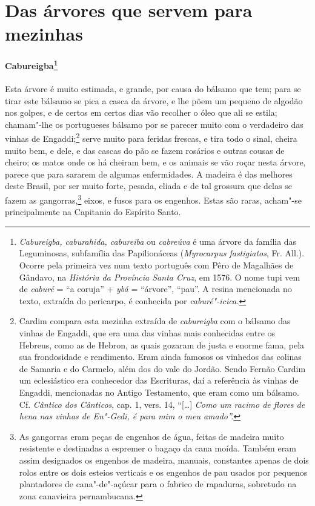 \section{Das árvores que servem para mezinhas}
\paragraph{Cabureigba\footnote{ \textit{Cabureigba, caburahida,
cabureiba} ou \textit{cabreúva} é uma árvore da família das
Leguminosas, subfamília das Papilionáceas (\textit{Myrocarpus
fastigiatos}, Fr. All.). Ocorre pela primeira vez num texto português
com Pêro de Magalhães de Gândavo, na \textit{História da Província Santa
Cruz}, em 1576. O nome tupi vem de \textit{caburé} = ``a
coruja'' + \textit{ybá} = ``árvore'', ``pau''. A resina mencionada no texto,
extraída do pericarpo, é conhecida por
\textit{caburé"-icica.}}} Esta árvore é muito estimada, e
grande, por causa do bálsamo que tem; para se tirar este bálsamo se
pica a casca da árvore, e lhe põem um pequeno de algodão nos golpes, e
de certos em certos dias vão recolher o óleo que ali se estila;
chamam"-lhe os portugueses bálsamo por se parecer muito com o verdadeiro
das vinhas de Engaddi;\footnote{ Cardim compara esta mezinha extraída
de \textit{cabureigba} com o bálsamo das vinhas de Engaddi, que era uma
das vinhas mais conhecidas entre os Hebreus, como as de Hebron, as
quais gozaram de justa e enorme fama, pela sua frondosidade e
rendimento. Eram ainda famosos os vinhedos das colinas de Samaria e do
Carmelo, além dos do vale do Jordão. Sendo Fernão Cardim um
eclesiástico era conhecedor das Escrituras, daí a referência às vinhas
de Engaddi, mencionadas no Antigo Testamento, que eram como um bálsamo.
Cf. \textit{Cântico dos Cânticos}, cap. 1, vers. 14, ``[\ldots{}] \textit{Como um
racimo de flores de hena nas vinhas de En"-Gedi, é para mim o meu
amado''.}} serve muito para feridas frescas, e tira todo o sinal,
cheira muito bem, e dele, e das cascas do pão se fazem rosários e
outras cousas de cheiro; os matos onde os há cheiram bem, e os animais
se vão roçar nesta árvore, parece que para sararem de algumas
enfermidades. A madeira é das melhores deste Brasil, por ser muito
forte, pesada, eliada e de tal grossura que delas se fazem as 
gangorras,\footnote{ As gangorras eram peças de engenhos de água, feitas de
madeira muito resistente e destinadas a espremer o bagaço da cana
moída. Também eram assim designados os engenhos de madeira, manuais,
constantes apenas de dois rolos entre os dois esteios verticais e os
engenhos de pau usados por pequenos plantadores de cana"-de"-açúcar para
o fabrico de rapaduras, sobretudo na zona canavieira pernambucana.}
eixos, e fusos para os engenhos. Estas são raras, acham"-se
principalmente na Capitania do Espírito Santo.

